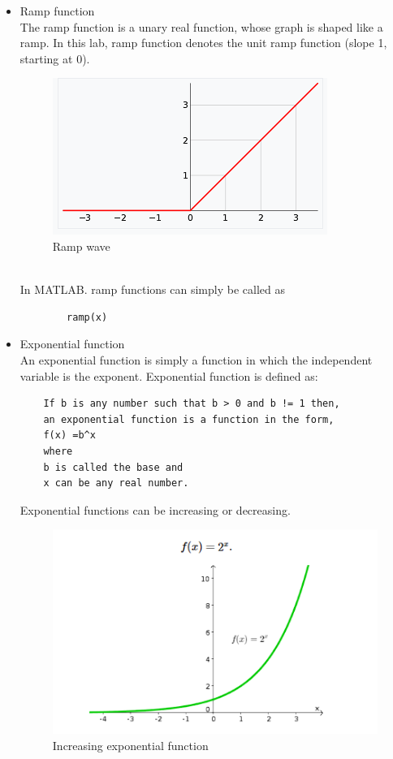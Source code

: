 \documentclass[12pt]{article}
\begin{document}
\begin{itemize}
    \item Ramp function\\
    The ramp function is a unary real function, whose graph is shaped like a ramp. 
    In this lab, ramp function denotes the unit ramp function (slope 1, starting at 0).
    \begin{figure}[h!]
        \centering
        \includegraphics[scale = 0.7]{labss/Lab2_TH_Ramp.PNG}
        \caption{Ramp wave} 
    \end{figure}\\
    In MATLAB. ramp functions can simply be called as 
    \begin{verbatim}
        ramp(x)
    \end{verbatim}
    \item Exponential function\\
    An exponential function is simply a function in which the independent variable is the exponent.
    Exponential function is defined as:
    \begin{Verbatim}
    If b is any number such that b > 0 and b != 1 then,
    an exponential function is a function in the form,
    f(x) =b^x
    where 
    b is called the base and 
    x can be any real number.
    \end{Verbatim}
    Exponential functions can be increasing or decreasing.
    \begin{figure}[h!]
        \centering
        \includegraphics[scale = 0.7]{labss/Lab2_TH_Exp_inc.PNG}
        \caption{Increasing exponential function} 
    \end{figure}\\


\end{itemize}
\end{document}
